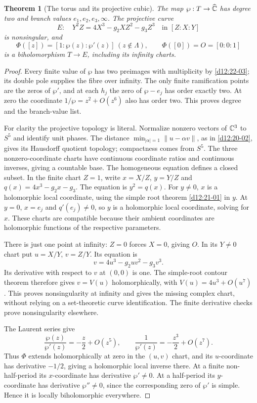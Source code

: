 \documentclass[11pt,a4paper,openany]{book}
\newtheorem{theorem}{Theorem}[chapter]
\theoremstyle{definition}
\theoremstyle{remark}\newtheorem{remark}[theorem]{Remark}
\newcommand{\family}[1]{}
\begin{document}
\begin{theorem}[The torus and its projective cubic]\label{d12:22-07}\family{D12.22.07}
The map $\wp:T\to\widehat{\mathbb C}$ has degree two and branch values
$e_1,e_2,e_3,\infty$. The projective curve
\[
 E:\quad Y^2Z=4X^3-g_2XZ^2-g_3Z^3\quad\text{in }[Z:X:Y]
\]
is nonsingular, and
\[
 \Phi([z])=[1:\wp(z):\wp'(z)]\ (z\notin\Lambda),\qquad
 \Phi([0])=O=[0:0:1]
\]
is a biholomorphism $T\to E$, including its infinity charts.
\end{theorem}
\begin{proof}
Every finite value of $\wp$ has two preimages with multiplicity by
\cref{d12:22-03}; its double pole supplies the fibre over infinity.
The only finite ramification points are the zeros of $\wp'$, and at
each $h_j$ the zero of $\wp-e_j$ has order exactly two. At zero the
coordinate $1/\wp=z^2+O(z^6)$ also has order two. This proves degree
and the branch-value list.

For clarity the projective topology is literal. Normalize nonzero
vectors of $\mathbb C^3$ to $S^5$ and identify unit phases. The distance
$\min_{|\alpha|=1}\|u-\alpha v\|$, as in
\cref{d12:20-02}, gives its Hausdorff quotient topology; compactness
comes from $S^5$. The three nonzero-coordinate charts have continuous
coordinate ratios and continuous inverses, giving a countable base.
The homogeneous equation defines a closed subset.
In the finite chart $Z=1$, write $x=X/Z$, $y=Y/Z$ and
$q(x)=4x^3-g_2x-g_3$. The equation is $y^2=q(x)$.
For $y\ne0$, $x$ is a holomorphic local coordinate, using the simple
root theorem \cref{d12:21-01} in $y$. At $y=0$, $x=e_j$ and
$q'(e_j)\ne0$, so $y$ is a holomorphic local coordinate, solving for
$x$. These charts are compatible because their ambient coordinates
are holomorphic functions of the respective parameters.

There is just one point at infinity: $Z=0$ forces $X=0$, giving $O$.
In its $Y\ne0$ chart put $u=X/Y$, $v=Z/Y$. Its equation is
\[
                     v=4u^3-g_2uv^2-g_3v^3.
\]
Its derivative with respect to $v$ at $(0,0)$ is one. The simple-root
contour theorem therefore gives $v=V(u)$ holomorphically, with
$V(u)=4u^3+O(u^7)$. This proves nonsingularity at infinity and gives
the missing complex chart, without relying on a set-theoretic curve
identification. The finite derivative checks prove nonsingularity
elsewhere.

The Laurent series give
\[
 \frac{\wp(z)}{\wp'(z)}=-\frac z2+O(z^5),\qquad
 \frac1{\wp'(z)}=-\frac{z^3}2+O(z^7).
\]
Thus $\Phi$ extends holomorphically at zero in the $(u,v)$ chart, and
its $u$-coordinate has derivative $-1/2$, giving a holomorphic local
inverse there. At a finite non-half-period its $x$-coordinate has
derivative $\wp'\ne0$. At a half-period its $y$-coordinate has
derivative $\wp''\ne0$, since the corresponding zero of $\wp'$ is
simple. Hence it is locally biholomorphic everywhere.


\end{proof}
\end{document}
